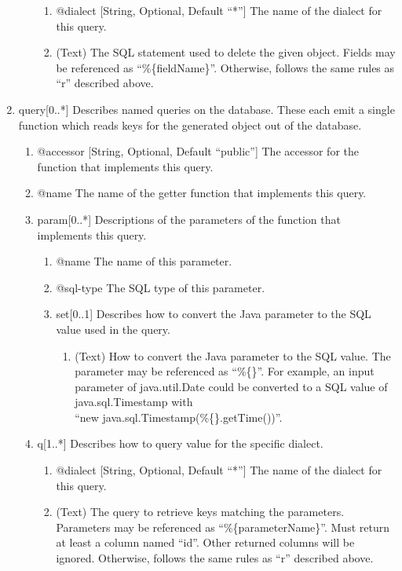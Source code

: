 \documentclass{book}
\begin{document}
\begin{enumerate}
\begin{enumerate}
        \begin{enumerate}
            \item @dialect [String, Optional, Default ``*''] The name of the
              dialect for this query.
            \item (Text) The SQL statement used to delete the given object.
                  Fields may be referenced as ``\%\{fieldName\}''. Otherwise,
                  follows the same rules as ``r'' described above.
        \end{enumerate}
    \end{enumerate}
    \item query[0..*] Describes named queries on the database. These each emit
          a single function which reads keys for the generated object out of
          the database.
    \begin{enumerate}
        \item @accessor [String, Optional, Default ``public''] The accessor for
              the function that implements this query.
        \item @name The name of the getter function that implements this query.
        \item param[0..*] Descriptions of the parameters of the function that
              implements this query.
        \begin{enumerate}
            \item @name The name of this parameter.
            \item @sql-type The SQL type of this parameter.
            \item set[0..1] Describes how to convert the Java parameter to the
                  SQL value used in the query.
            \begin{enumerate}
                \item (Text) How to convert the Java parameter to the SQL value.
                      The parameter may be referenced as ``\%\{\}''. For
                      example, an input parameter of java.util.Date could be
                      converted to a SQL value of java.sql.Timestamp with\\
                      ``new java.sql.Timestamp(\%\{\}.getTime())''.
            \end{enumerate}
        \end{enumerate}
        \item q[1..*] Describes how to query value for the specific dialect.
        \begin{enumerate}
            \item @dialect [String, Optional, Default ``*''] The name of the
                  dialect for this query.
            \item (Text) The query to retrieve keys matching the parameters.
                  Parameters may be referenced as ``\%\{parameterName\}''. Must
                  return at least a column named ``id''. Other returned columns
                  will be ignored. Otherwise, follows the same rules as ``r''
                  described above.
        \end{enumerate}
    \end{enumerate}
\end{enumerate}
\end{document}
